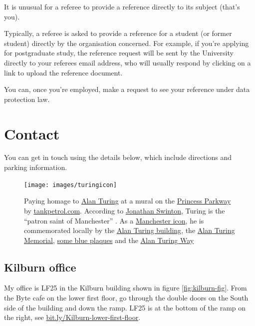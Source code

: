 \documentclass[
  12pt,
]{book}
\begin{document}
It is unusual for a referee to provide a reference directly to its subject (that's you).

Typically, a referee is asked to provide a reference for a student (or former student) directly by the organisation concerned. For example, if you're applying for postgraduate study, the reference request will be sent by the University directly to your referees email address, who will usually respond by clicking on a link to upload the reference document.

You can, once you're employed, make a request to see your reference under data protection law.

\hypertarget{contact}{%
\chapter{Contact}\label{contact}}

You can get in touch using the details below, which include directions and parking information.



\begin{figure}

{\centering \texttt{[image: images/turingicon]} 

}

\caption{Paying homage to \href{https://en.wikipedia.org/wiki/Alan_Turing}{Alan Turing} at a mural on the \href{https://en.wikipedia.org/wiki/A5103_road}{Princess Parkway} by \href{http://tankpetrol.com/}{tankpetrol.com}. According to \href{https://www.manturing.net/jonathan}{Jonathan Swinton}, Turing is the ``patron saint of Manchester'' \citep{manturing}. As a \href{https://en.wikipedia.org/wiki/Symbols_of_Manchester}{Manchester icon}, he is commemorated locally by the \href{https://en.wikipedia.org/wiki/Alan_Turing_Building}{Alan Turing building}, the \href{https://en.wikipedia.org/wiki/Alan_Turing_Memorial}{Alan Turing Memorial}, \href{https://duncan.hull.name/2021/07/07/turings-house/}{some blue plaques} and the \href{https://www.google.com/maps/place/Alan+Turing+Way,+Manchester/}{Alan Turing Way} \citep{turingway}}\label{fig:unnamed-chunk-9}
\end{figure}

\hypertarget{office}{%
\section{Kilburn office}\label{office}}

My office is LF25 in the Kilburn building shown in figure \ref{fig:kilburn-fig}. From the Byte cafe on the lower first floor, go through the double doors on the South side of the building and down the ramp. LF25 is at the bottom of the ramp on the right, see \href{https://bit.ly/Kilburn-lower-first-floor}{bit.ly/Kilburn-lower-first-floor}.
\end{document}
